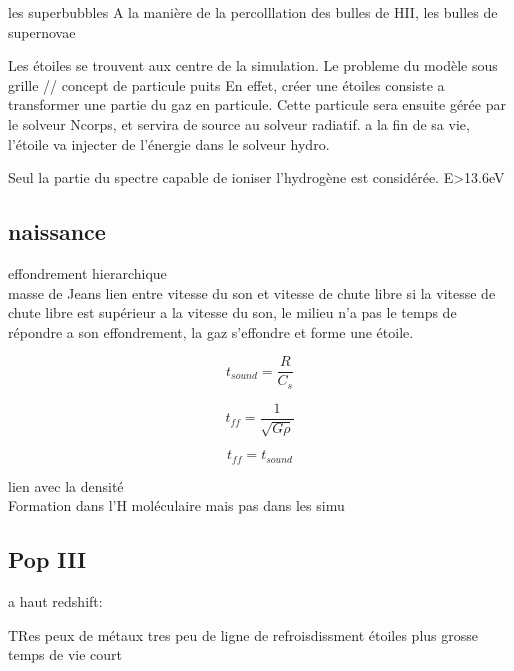 les superbubbles
A la manière de la percolllation des bulles de HII, les bulles de supernovae 








Les étoiles se trouvent aux centre de la simulation.
Le probleme du modèle sous grille
// concept de particule puits 
En effet, créer une étoiles consiste a transformer une partie du gaz en particule.
Cette particule sera ensuite gérée par le solveur Ncorps, et servira de source au solveur radiatif.
a la fin de sa vie, l'étoile va injecter de l'énergie dans le solveur hydro.


Seul la partie du spectre capable de ioniser l'hydrogène est considérée. E>13.6eV

\subsection{naissance}
effondrement hierarchique\\

masse de Jeans
lien entre vitesse du son et vitesse de chute libre
si la vitesse de chute libre est supérieur a la vitesse du son, le milieu n'a pas le temps de répondre a son effondrement, la gaz s'effondre et forme une étoile.

\begin{equation}
t_{sound} = \frac{R}{C_s}
\end{equation}

\begin{equation}
t_{ff} = \frac{1}{\sqrt{G \rho}}
\end{equation}

\begin{equation}
t_{ff} = t_{sound}
\end{equation}




lien avec la densité\\

Formation dans l'H moléculaire mais pas dans les simu

\subsection{Pop III}


a haut redshift:

TRes peux de métaux
tres peu de ligne de refroisdissment
étoiles plus grosse
 temps de vie court




